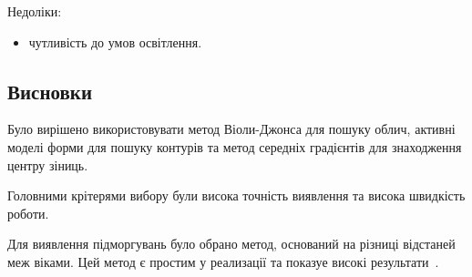 Недоліки:
\begin{itemize}
	\item чутливість до умов освітлення. 
\end{itemize}

\subsection{Висновки}
Було вирішено використовувати метод Віоли-Джонса для пошуку облич, активні моделі форми для пошуку контурів та метод середніх градієнтів для знаходження центру зіниць.

Головними крітерями вибору були висока точність виявлення та висока швидкість роботи.

Для виявлення підморгувань було обрано метод, оснований на різниці відстаней меж віками. Цей метод є простим у реализації та показуе високі результати~\cite{Blink2014}.
